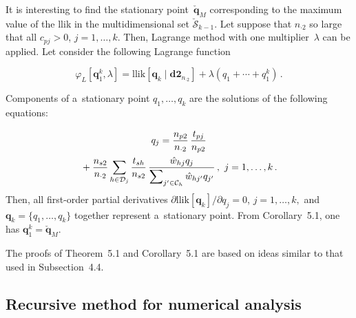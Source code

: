 \begin{multicols}{2}
\smallskip

It is interesting to find  the  stationary point~$\check{\mathbf{q}}_{M}$
    corresponding to  the maximum value of the llik
      in the multidimensional set
     $\breve{\mathcal{S}}_{k-1}.$
Let suppose that $n_{\cdot 2}$ so large that all $c_{pj}>0$, $j=1, \ldots, k.$
       Then, Lagrange  method with one  multiplier~$\lambda$ can be applied.
 Let consider the following {Lagrange function}
 
 \vspace*{4pt}
 
 \noindent
 $$
    \varphi_L \left[\mathbf{q}_1^k, \lambda \right] =\mathrm{llik} \left[\mathbf{q}_k
   \mid    \mathbf{d2}_{n_{\cdot 2}}\right] +\lambda (q_1+ \cdots + q_1^k)\,.
$$

\vspace*{-2pt}

Components of a~stationary point $q_1, \ldots, q_k$ are the solutions of
the following equations:

\vspace*{-3pt}

\noindent
\begin{multline}
\label{FR-525}
 q_j = \displaystyle\frac{\displaystyle n_{p 2}\mathstrut}{\displaystyle n_{\cdot 2}\mathstrut}\,\displaystyle\frac{\displaystyle t_{pj}\mathstrut}{\displaystyle n_{p 2}\mathstrut}
\\
{} +  \displaystyle\frac{\displaystyle n_{s 2}\mathstrut}{\displaystyle n_{\cdot 2}\mathstrut}  \sum\limits_{h\in\mathcal{D}_j}
   \displaystyle\frac{\displaystyle t_{s h}\mathstrut}{\displaystyle n_{s 2}\mathstrut} \,\displaystyle\frac{\displaystyle \hat w_{hj} q_j\mathstrut}{\displaystyle \sum\nolimits_{j'\in\mathcal{C}_h}\hat w_{hj'}q_{j'}\mathstrut}\,,\  j=1, \ldots, k\,.
\end{multline}
Then, all first-order partial derivatives 
${\partial \mathrm{llik} [\mathbf{q}_k]}/{\partial q_j}$\linebreak $=0$, 
$j=1, \ldots, k,$ and $\mathbf{q}_k=\{ q_1, \ldots, q_k\}$ 
together represent a~stationary point. From Corollary~5.1,
one has $\mathbf{q}_1^k=\check{\mathbf{q}}_{M}.$

The proofs of Theorem~5.1 and Corollary~5.1 
are based on ideas similar to that used in Subsection~4.4.

\vspace*{-3pt}

\subsection{Recursive method for numerical analysis}


\end{multicols}
